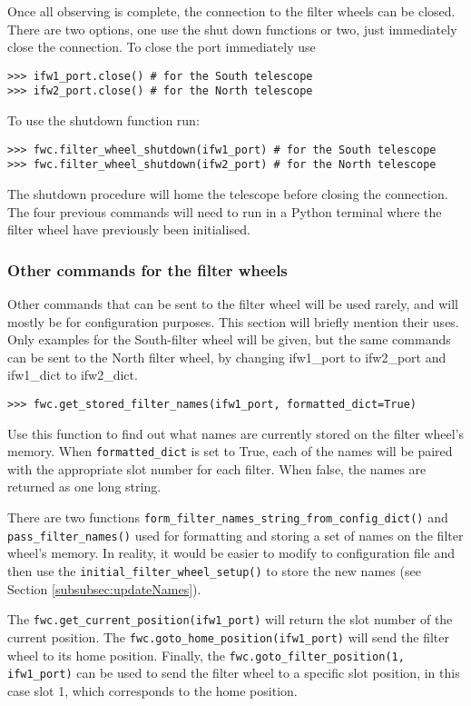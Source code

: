 \documentclass[a4paper,12pt]{article}
\begin{document}
Once all observing is complete, the connection to the filter wheels can be closed. There are two options, one use the shut down functions or two, just immediately close the connection. To close the port immediately use
\begin{verbatim}
>>> ifw1_port.close() # for the South telescope
>>> ifw2_port.close() # for the North telescope
\end{verbatim}
To use the shutdown function run:
\begin{verbatim}
>>> fwc.filter_wheel_shutdown(ifw1_port) # for the South telescope
>>> fwc.filter_wheel_shutdown(ifw2_port) # for the North telescope
\end{verbatim}
The shutdown procedure will home the telescope before closing the connection. The four previous commands will need to run in a Python terminal where the filter wheel have previously been initialised.

\subsubsection{Other commands for the filter wheels}

Other commands that can be sent to the filter wheel will be used rarely, and will mostly be for configuration purposes. This section will briefly mention their uses. Only examples for the South-filter wheel will be given, but the same commands can be sent to the North filter wheel, by changing ifw1\_port to ifw2\_port and ifw1\_dict to ifw2\_dict.

\begin{verbatim}
>>> fwc.get_stored_filter_names(ifw1_port, formatted_dict=True)
\end{verbatim}
Use this function to find out what names are currently stored on the filter wheel's memory. When {\tt formatted\_dict} is set to True, each of the names will be paired with the appropriate slot number for each filter. When false, the names are returned as one long string.

There are two functions {\tt form\_filter\_names\_string\_from\_config\_dict()} and {\tt pass\_filter\_names()} used for formatting and storing a set of names on the filter wheel's memory. In reality, it would be easier to modify to configuration file and then use the {\tt initial\_filter\_wheel\_setup()} to store the new names (see Section \ref{subsubsec:updateNames}).

The {\tt fwc.get\_current\_position(ifw1\_port)} will return the slot number of the current position. The {\tt fwc.goto\_home\_position(ifw1\_port)} will send the filter wheel to its home position. Finally, the {\tt fwc.goto\_filter\_position(1, ifw1\_port)} can be used to send the filter wheel to a specific slot position, in this case slot 1, which corresponds to the home position.
\end{document}
